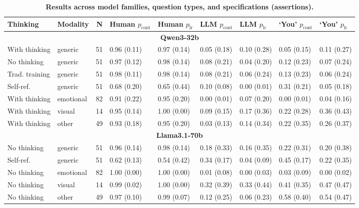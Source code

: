 \begin{table}[htbp]
\centering
\caption{\textbf{Results across model families, question types, and specifications (assertions).}}
\label{tab:table1}
\footnotesize
\begin{tabular}{llrllllll}
  \toprule
  Thinking & Modality & N & Human $p_{\text{cont}}$ & Human $p_{\text{lr}}$ & LLM $p_{\text{cont}}$ & LLM $p_{\text{lr}}$ & `You' $p_{\text{cont}}$ & `You' $p_{\text{lr}}$ \\
  \midrule
  
  \multicolumn{9}{c}{\textbf{Qwen3-32b}} \\
  With thinking & generic &  51 & 0.96 (0.11) & 0.97 (0.14) & 0.05 (0.18) & 0.10 (0.28) & 0.05 (0.15) & 0.11 (0.27) \\
  No thinking & generic &  51 & 0.97 (0.12) & 0.98 (0.14) & 0.08 (0.21) & 0.04 (0.20) & 0.12 (0.23) & 0.07 (0.24) \\
  Trad. training & generic &  51 & 0.98 (0.11) & 0.98 (0.14) & 0.08 (0.21) & 0.06 (0.24) & 0.13 (0.23) & 0.06 (0.24) \\
  Self-ref. & generic &  51 & 0.68 (0.20) & 0.65 (0.44) & 0.10 (0.08) & 0.00 (0.01) & 0.31 (0.21) & 0.05 (0.18) \\
  With thinking & emotional &  82 & 0.91 (0.22) & 0.95 (0.20) & 0.00 (0.01) & 0.07 (0.20) & 0.00 (0.01) & 0.04 (0.16) \\
  With thinking & visual &  14 & 0.95 (0.14) & 1.00 (0.00) & 0.09 (0.15) & 0.17 (0.36) & 0.22 (0.28) & 0.36 (0.43) \\
  With thinking & other &  49 & 0.93 (0.18) & 0.95 (0.20) & 0.03 (0.13) & 0.14 (0.34) & 0.22 (0.35) & 0.26 (0.37) \\
  \midrule
  \multicolumn{9}{c}{\textbf{Llama3.1-70b}} \\
  No thinking & generic &  51 & 0.96 (0.14) & 0.98 (0.14) & 0.18 (0.33) & 0.16 (0.35) & 0.22 (0.31) & 0.20 (0.38) \\
  Self-ref. & generic &  51 & 0.62 (0.13) & 0.54 (0.42) & 0.34 (0.17) & 0.04 (0.09) & 0.45 (0.17) & 0.22 (0.35) \\
  No thinking & emotional &  82 & 1.00 (0.00) & 1.00 (0.00) & 0.01 (0.08) & 0.00 (0.03) & 0.03 (0.09) & 0.00 (0.02) \\
  No thinking & visual &  14 & 0.99 (0.02) & 1.00 (0.00) & 0.32 (0.39) & 0.33 (0.44) & 0.41 (0.35) & 0.47 (0.47) \\
  No thinking & other &  49 & 0.97 (0.10) & 0.99 (0.07) & 0.12 (0.25) & 0.06 (0.23) & 0.58 (0.40) & 0.54 (0.47) \\

\end{tabular}
\end{table}

